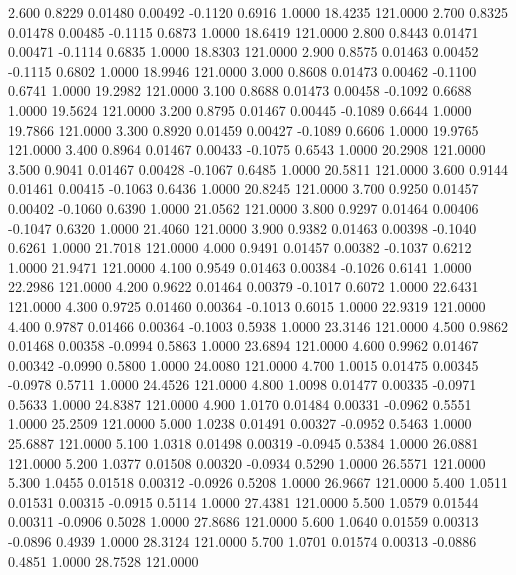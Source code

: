    2.600   0.8229   0.01480   0.00492  -0.1120   0.6916   1.0000  18.4235 121.0000
   2.700   0.8325   0.01478   0.00485  -0.1115   0.6873   1.0000  18.6419 121.0000
   2.800   0.8443   0.01471   0.00471  -0.1114   0.6835   1.0000  18.8303 121.0000
   2.900   0.8575   0.01463   0.00452  -0.1115   0.6802   1.0000  18.9946 121.0000
   3.000   0.8608   0.01473   0.00462  -0.1100   0.6741   1.0000  19.2982 121.0000
   3.100   0.8688   0.01473   0.00458  -0.1092   0.6688   1.0000  19.5624 121.0000
   3.200   0.8795   0.01467   0.00445  -0.1089   0.6644   1.0000  19.7866 121.0000
   3.300   0.8920   0.01459   0.00427  -0.1089   0.6606   1.0000  19.9765 121.0000
   3.400   0.8964   0.01467   0.00433  -0.1075   0.6543   1.0000  20.2908 121.0000
   3.500   0.9041   0.01467   0.00428  -0.1067   0.6485   1.0000  20.5811 121.0000
   3.600   0.9144   0.01461   0.00415  -0.1063   0.6436   1.0000  20.8245 121.0000
   3.700   0.9250   0.01457   0.00402  -0.1060   0.6390   1.0000  21.0562 121.0000
   3.800   0.9297   0.01464   0.00406  -0.1047   0.6320   1.0000  21.4060 121.0000
   3.900   0.9382   0.01463   0.00398  -0.1040   0.6261   1.0000  21.7018 121.0000
   4.000   0.9491   0.01457   0.00382  -0.1037   0.6212   1.0000  21.9471 121.0000
   4.100   0.9549   0.01463   0.00384  -0.1026   0.6141   1.0000  22.2986 121.0000
   4.200   0.9622   0.01464   0.00379  -0.1017   0.6072   1.0000  22.6431 121.0000
   4.300   0.9725   0.01460   0.00364  -0.1013   0.6015   1.0000  22.9319 121.0000
   4.400   0.9787   0.01466   0.00364  -0.1003   0.5938   1.0000  23.3146 121.0000
   4.500   0.9862   0.01468   0.00358  -0.0994   0.5863   1.0000  23.6894 121.0000
   4.600   0.9962   0.01467   0.00342  -0.0990   0.5800   1.0000  24.0080 121.0000
   4.700   1.0015   0.01475   0.00345  -0.0978   0.5711   1.0000  24.4526 121.0000
   4.800   1.0098   0.01477   0.00335  -0.0971   0.5633   1.0000  24.8387 121.0000
   4.900   1.0170   0.01484   0.00331  -0.0962   0.5551   1.0000  25.2509 121.0000
   5.000   1.0238   0.01491   0.00327  -0.0952   0.5463   1.0000  25.6887 121.0000
   5.100   1.0318   0.01498   0.00319  -0.0945   0.5384   1.0000  26.0881 121.0000
   5.200   1.0377   0.01508   0.00320  -0.0934   0.5290   1.0000  26.5571 121.0000
   5.300   1.0455   0.01518   0.00312  -0.0926   0.5208   1.0000  26.9667 121.0000
   5.400   1.0511   0.01531   0.00315  -0.0915   0.5114   1.0000  27.4381 121.0000
   5.500   1.0579   0.01544   0.00311  -0.0906   0.5028   1.0000  27.8686 121.0000
   5.600   1.0640   0.01559   0.00313  -0.0896   0.4939   1.0000  28.3124 121.0000
   5.700   1.0701   0.01574   0.00313  -0.0886   0.4851   1.0000  28.7528 121.0000
